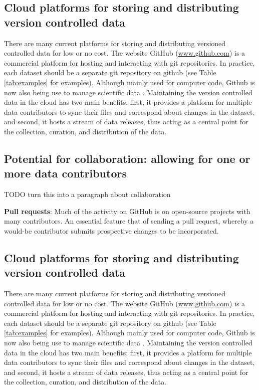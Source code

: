 \documentclass[a4paper,11pt]{article}
\newcommand{\smurl}[1]{{\footnotesize\url{#1}}}
\begin{document}
\subsection{Cloud platforms for storing and distributing version controlled data}

There are many current platforms for storing and distributing versioned controlled data for low or no cost.  The website GitHub (\smurl{www.github.com}) is a commercial platform for hosting and interacting with git repositories. In practice, each dataset should be a separate git repository on github (see Table \ref{tab:examples} for examples). Although mainly used for computer code, Github is now also being use to manage scientific data \citep{Perkel-2016}. Maintaining the version controlled data in the cloud has two main benefits: first, it provides a platform for multiple data contributors to sync their files and correspond about changes in the dataset, and second, it hosts a stream of data releases, thus acting as a central point for  the collection, curation, and distribution of the data.

\subsection{Potential for collaboration: allowing for one or more data contributors}

TODO turn this into a paragraph about collaboration

\textbf{Pull requests}: Much of the activity on GitHub is on open-source projects with many contributors. An essential feature that of sending a pull request, whereby a would-be contributor submits prospective changes to be incorporated.

\subsection{Cloud platforms for storing and distributing version controlled data}

There are many current platforms for storing and distributing versioned controlled data for low or no cost.  The website GitHub (\smurl{www.github.com}) is a commercial platform for hosting and interacting with git repositories. In practice, each dataset should be a separate git repository on github (see Table \ref{tab:examples} for examples). Although mainly used for computer code, Github is now also being use to manage scientific data \citep{Perkel-2016}. Maintaining the version controlled data in the cloud has two main benefits: first, it provides a platform for multiple data contributors to sync their files and correspond about changes in the dataset, and second, it hosts a stream of data releases, thus acting as a central point for  the collection, curation, and distribution of the data.
\end{document}
